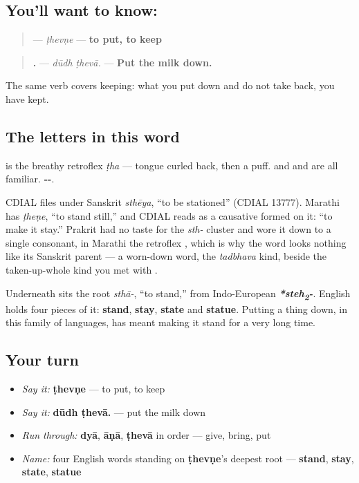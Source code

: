 \subsection*{You'll want to know: }
\begin{quote}
\textbf{} — \emph{ṭhevṇe} — \textbf{to put, to keep}
\end{quote}

\begin{quote}
\textbf{ .} — \emph{dūdh ṭhevā.} — \textbf{Put the milk down.}
\end{quote}

The same verb covers keeping: what you put down and do not take back, you have kept.

\subsection*{The letters in this word}
\textbf{} is the breathy retroflex \emph{ṭha} — tongue curled back, then a puff. \textbf{} and \textbf{} and \textbf{} are all familiar. \textbf{--}.

\begin{cousinweb}
CDIAL files \textbf{} under Sanskrit \emph{sthēya}, \textquotedblleft{}to be stationed\textquotedblright{} (CDIAL 13777). Marathi has \emph{ṭheṇe}, \textquotedblleft{}to stand still,\textquotedblright{} and CDIAL reads \textbf{} as a causative formed on it: \textquotedblleft{}to make it stay.\textquotedblright{} Prakrit had no taste for the \emph{sth-} cluster and wore it down to a single consonant, in Marathi the retroflex \textbf{}, which is why the word looks nothing like its Sanskrit parent — a worn-down word, the \emph{tadbhava} kind, beside the taken-up-whole kind you met with \textbf{}.

Underneath sits the root \emph{sthā-}, \textquotedblleft{}to stand,\textquotedblright{} from Indo-European \emph{\textbf{*steh\textsubscript{2}-}}. English holds four pieces of it: \textbf{stand}, \textbf{stay}, \textbf{state} and \textbf{statue}. Putting a thing down, in this family of languages, has meant making it stand for a very long time.
\end{cousinweb}

\subsection*{Your turn}
\begin{itemize}
\raggedright
  \item \emph{Say it:} \textbf{ṭhevṇe} — to put, to keep
  \item \emph{Say it:} \textbf{dūdh ṭhevā.} — put the milk down
  \item \emph{Run through:} \textbf{dyā}, \textbf{āṇā}, \textbf{ṭhevā} in order — give, bring, put
  \item \emph{Name:} four English words standing on \textbf{ṭhevṇe}'s deepest root — \textbf{stand}, \textbf{stay}, \textbf{state}, \textbf{statue}
\end{itemize}

